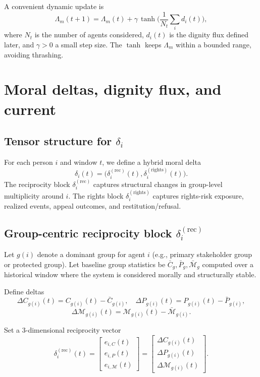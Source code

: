 \documentclass[11pt]{article}
\begin{document}
A convenient dynamic update is
\[
\Lambda_m(t+1) = \Lambda_m(t) + \gamma \,\tanh\!\Big(\frac{1}{N_t}\sum_{i} d_i(t)\Big),
\]
where \(N_t\) is the number of agents considered, \(d_i(t)\) is the dignity flux defined later, and \(\gamma>0\) a small step size.
The \(\tanh\) keeps \(\Lambda_m\) within a bounded range, avoiding thrashing.

\section{Moral deltas, dignity flux, and current}

\subsection{Tensor structure for \texorpdfstring{\(\delta_i\)}{delta\_i}}

For each person \(i\) and window \(t\), we define a hybrid moral delta
\[
\delta_i(t) = \big(\delta_i^{(\text{rec})}(t), \delta_i^{(\text{rights})}(t)\big).
\]
The reciprocity block \(\delta_i^{(\text{rec})}\) captures structural changes in group-level multiplicity around \(i\).
The rights block \(\delta_i^{(\text{rights})}\) captures rights-risk exposure, realized events, appeal outcomes, and restitution/refusal.

\subsection{Group-centric reciprocity block \texorpdfstring{\(\delta_i^{(\text{rec})}\)}{delta\_i\^rec}}

Let \(g(i)\) denote a dominant group for agent \(i\) (e.g., primary stakeholder group or protected group).
Let baseline group statistics be \(\bar{C}_{g}, \bar{P}_{g}, \bar{\mathcal{M}}_{g}\) computed over a historical window where the system is considered morally and structurally stable.

Define deltas
\[
\Delta C_{g(i)}(t) = C_{g(i)}(t) - \bar{C}_{g(i)},\quad
\Delta P_{g(i)}(t) = P_{g(i)}(t) - \bar{P}_{g(i)},
\]
\[
\Delta \mathcal{M}_{g(i)}(t) = \mathcal{M}_{g(i)}(t) - \bar{\mathcal{M}}_{g(i)}.
\]

Set a 3-dimensional reciprocity vector
\[
\delta_i^{(\text{rec})}(t) =
\begin{bmatrix}
e_{i,C}(t) \\
e_{i,P}(t) \\
e_{i,\mathcal{M}}(t)
\end{bmatrix}
=
\begin{bmatrix}
\Delta C_{g(i)}(t) \\
\Delta P_{g(i)}(t) \\
\Delta \mathcal{M}_{g(i)}(t)
\end{bmatrix}.
\]
\end{document}
